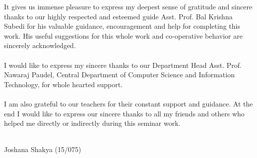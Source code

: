 It gives us immense pleasure to express my deepest sense of gratitude and sincere thanks to our highly respected and esteemed guide Asst. Prof. Bal Krishna Subedi for his valuable guidance, encouragement and help for completing this work. His useful suggestions for this whole work and co-operative behavior are sincerely acknowledged.
\\\\
I would like to express my sincere thanks to our Department Head Asst. Prof. Nawaraj Paudel, Central Department of Computer Science and Information Technology, for whole hearted support.
\\\\
I am also grateful to our teachers for their constant support and guidance. At the end I would like to express our sincere thanks to all my friends and others who helped me directly or indirectly during this seminar work.
\\\\
\begin{flushright}
	Joshana Shakya (15/075)
\end{flushright}